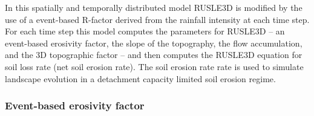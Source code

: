 \documentclass[gmd, manuscript]{copernicus}
\begin{document}
In this spatially and temporally distributed model 
RUSLE3D is modified by the use of a 
event-based R-factor derived from the rainfall intensity 
at each time step.
For each time step this model computes the parameters for RUSLE3D -- 
an event-based erosivity factor,
the slope of the topography, the flow accumulation, and
the 3D topographic factor -- and then
computes the RUSLE3D equation for soil loss rate (net soil erosion rate). 
The soil erosion rate rate is used to simulate landscape evolution 
in a detachment capacity limited soil erosion regime.



\subsubsection{Event-based erosivity factor}
\end{document}
